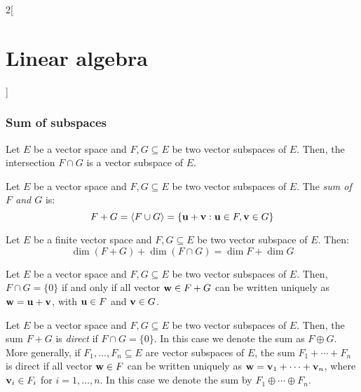 \documentclass[../../../main.tex]{subfiles}
\begin{document}
\begin{multicols}{2}[\section{Linear algebra}]
\subsubsection*{Sum of subspaces}
\begin{lemma}
    Let $E$ be a vector space and $F,G\subseteq E$ be two vector subspaces of $E$. Then, the intersection $F\cap G$ is a vector subspace of $E$.
\end{lemma}
\begin{definition}
    Let $E$ be a vector space and $F,G\subseteq E$ be two vector subspaces of $E$. The \textit{sum of $F$ and $G$} is: $$F+G=\langle F\cup G\rangle=\{\vb{u}+\vb{v}: \vb{u}\in F,\vb{v}\in G\}$$
\end{definition}
\begin{prop}
    Let $E$ be a finite vector space and $F,G\subseteq E$ be two vector subspace of $E$. Then: $$\dim (F+G)+\dim(F\cap G)=\dim F+\dim G$$
\end{prop}
\begin{lemma}
    Let $E$ be a vector space and $F,G\subseteq E$ be two vector subspaces of $E$. Then, $F\cap G=\{0\}$ if and only if all vector $\vb{w}\in F+G$ can be written uniquely as $\vb{w}=\vb{u}+\vb{v}$, with $\vb{u}\in F$ and $\vb{v}\in G$.
\end{lemma}
\begin{definition}
    Let $E$ be a vector space and $F,G\subseteq E$ be two vector subspaces of $E$. Then, the sum $F+G$ is \textit{direct} if $F\cap G=\{0\}$. In this case we denote the sum as $F\oplus G$. More generally, if $F_1,\ldots,F_n\subseteq E$ are vector subspaces of $E$, the sum $F_1+\cdots+F_n$ is direct if all vector $\vb{w}\in F$ can be written uniquely as $\vb{w}=\vb{v}_1+\cdots+\vb{v}_n$, where $\vb{v}_i\in F_i$ for $i=1,\ldots,n$. In this case we denote the sum by $F_1\oplus\cdots\oplus F_n$.
\end{definition}

\end{multicols}
\end{document}
